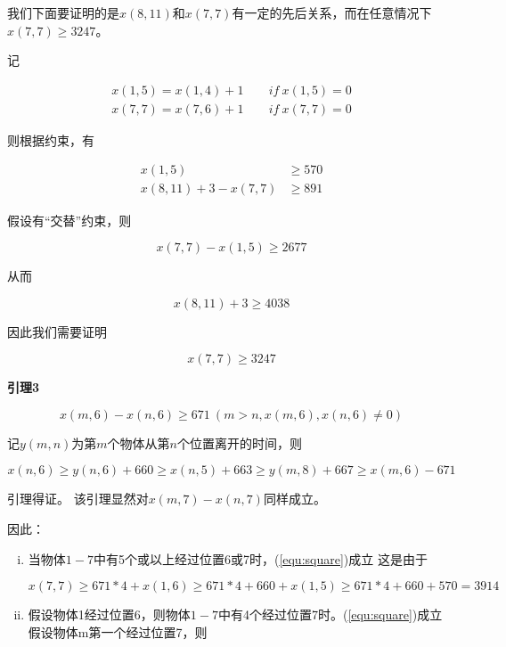 \documentclass{ctexart}
\begin{document}
{{    	我们下面要证明的是$x(8,11)$和$x(7,7)$有一定的先后关系，而在任意情况下$x(7,7) \ge 3247$。
    	
    	
        记
        
        $$
        \begin{aligned}
        x(1, 5)=x(1,4)+1&\ \quad if \  x(1,5)=0\\
        x(7, 7)=x(7,6)+1&\ \quad if\ x(7,7)=0
        \end{aligned}
        $$
        
        则根据约束，有
        
        $$
        \begin{aligned}
        x(1,5)&\ge570\\
        x(8,11)+3-x(7,7)&\ge891
        \end{aligned}
        $$
        
        假设有“交替”约束，则
        
        $$
        x(7, 7)-x(1, 5)\ge2677
        $$
        
        从而
        
        $$
        x(8,11)+3\ge4038
        $$
        
        因此我们需要证明
        
        \begin{equation}\label{equ:square}　
        	x(7,7)\ge3247
        \end{equation}
        
        
        \textbf{引理3}
        
        $$
        x(m,6)-x(n,6)\ge671\ (m>n, x(m,6),x(n,6)\neq0) 
        $$
        
        记$y(m,n)$为第$m$个物体从第$n$个位置离开的时间，则
        
        $$
        x(n,6)\ge y(n,6)+660\ge x(n,5)+663\ge y(m,8)+667 \ge x(m,6)-671
        $$
        
        引理得证。
        该引理显然对$x(m,7)-x(n,7)$同样成立。
        
        因此：
        
        \begin{enumerate}[(i)]
        	\item 当物体$1-7$中有5个或以上经过位置6或7时，(\ref{equ:square})成立
        	这是由于
        	
        	$$
        	x(7,7)\ge 671*4+x(1,6)\ge 671*4+660+x(1,5)\ge 671*4+660+570=3914
        	$$
        	\item 假设物体1经过位置6，则物体$1-7$中有4个经过位置7时。(\ref{equ:square})成立
        	假设物体m第一个经过位置7，则
        	

\end{enumerate}}}
\end{document}
